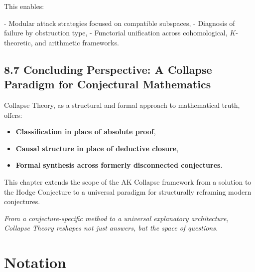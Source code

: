 \documentclass[11pt]{article}
\begin{document}
This enables:

- Modular attack strategies focused on compatible subspaces,
- Diagnosis of failure by obstruction type,
- Functorial unification across cohomological, $K$-theoretic, and arithmetic frameworks.

\subsection{8.7 Concluding Perspective: A Collapse Paradigm for Conjectural Mathematics}

Collapse Theory, as a structural and formal approach to mathematical truth, offers:

\begin{itemize}
  \item \textbf{Classification in place of absolute proof},
  \item \textbf{Causal structure in place of deductive closure},
  \item \textbf{Formal synthesis across formerly disconnected conjectures}.
\end{itemize}

This chapter extends the scope of the AK Collapse framework from a solution to the Hodge Conjecture to a universal paradigm for structurally reframing modern conjectures.

\begin{center}
\emph{From a conjecture-specific method to a universal explanatory architecture,  
Collapse Theory reshapes not just answers, but the space of questions.}
\end{center}



\section*{Notation}
\end{document}

